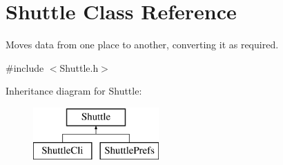 \hypertarget{class_shuttle}{}\section{Shuttle Class Reference}
\label{class_shuttle}


Moves data from one place to another, converting it as required.  




{\ttfamily \#include $<$Shuttle.\+h$>$}

Inheritance diagram for Shuttle\+:\begin{figure}[H]
\begin{center}
\leavevmode
\includegraphics[height=2.000000cm]{class_shuttle}
\end{center}
\end{figure}
